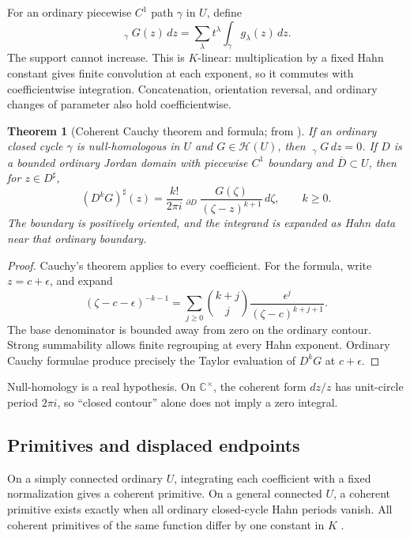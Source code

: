 \documentclass[11pt,letterpaper]{article}
\newtheorem{theorem}{Theorem}[section]
\theoremstyle{definition}
\theoremstyle{remark}
\newcommand{\C}{\mathbb C}
\newcommand{\HH}{\mathcal H}
\newcommand{\HInt}{\mathop{\int^{\!H}}\nolimits}
\newcommand{\HCoint}{\mathop{\oint^{\!H}}\nolimits}
\newcommand{\sh}{^{\sharp}}
\numberwithin{equation}{section}
\begin{document}
For an ordinary piecewise $C^1$ path $\gamma$ in $U$, define
\begin{equation}\label{eq:Hintegral}
\HInt_\gamma G(z)\,dz
 =\sum_\lambda t^\lambda\int_\gamma g_\lambda(z)\,dz.
\end{equation}
The support cannot increase. This is $K$-linear: multiplication by a fixed Hahn constant gives finite convolution at each exponent, so it commutes with coefficientwise integration. Concatenation, orientation reversal, and ordinary changes of parameter also hold coefficientwise.

\begin{theorem}[Coherent Cauchy theorem and formula; from \cite{SA}]\label{thm:Cauchy}
If an ordinary closed cycle $\gamma$ is null-homologous in $U$ and $G\in\HH(U)$, then $\HCoint_\gamma G\,dz=0$. If $D$ is a bounded ordinary Jordan domain with piecewise $C^1$ boundary and $\overline D\subset U$, then for $z\in D\sh$,
\begin{equation}\label{eq:Cauchy}
(D^kG)\sh(z)=\frac{k!}{2\pi i}\HCoint_{\partial D}
 \frac{G(\zeta)}{(\zeta-z)^{k+1}}\,d\zeta,
 \qquad k\ge0.
\end{equation}
The boundary is positively oriented, and the integrand is expanded as Hahn data near that ordinary boundary.
\end{theorem}
\begin{proof}
Cauchy's theorem applies to every coefficient. For the formula, write $z=c+\epsilon$, and expand
\[
(\zeta-c-\epsilon)^{-k-1}
=\sum_{j\ge0}\binom{k+j}{j}
 \frac{\epsilon^j}{(\zeta-c)^{k+j+1}}.
\]
The base denominator is bounded away from zero on the ordinary contour. Strong summability allows finite regrouping at every Hahn exponent. Ordinary Cauchy formulae produce precisely the Taylor evaluation of $D^kG$ at $c+\epsilon$.
\end{proof}
Null-homology is a real hypothesis. On $\C^\times$, the coherent form $dz/z$ has unit-circle period $2\pi i$, so ``closed contour'' alone does not imply a zero integral.

\subsection{Primitives and displaced endpoints}
On a simply connected ordinary $U$, integrating each coefficient with a fixed normalization gives a coherent primitive. On a general connected $U$, a coherent primitive exists exactly when all ordinary closed-cycle Hahn periods vanish. All coherent primitives of the same function differ by one constant in $K$ \cite[\S6]{SA}.
\end{document}
